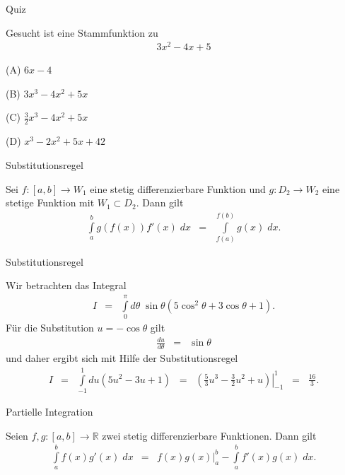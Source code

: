 \documentclass[german]{beamer}
\newcommand{\bq}{\begin{eqnarray*}}
\newcommand{\eq}{\end{eqnarray*}}
\begin{document}
\begin{frame}{Quiz}

Gesucht ist eine Stammfunktion zu
\bq
 3 x^2 - 4 x + 5
\eq
\begin{description}
\item{(A)} $6 x - 4$
\item{(B)} $3 x^3 - 4 x^2 + 5 x$
\item{(C)} $\frac{3}{2}x^3-4x^2 + 5 x$
\item{(D)} $x^3 -2 x^2 + 5 x + 42$
\end{description}

\end{frame}

\begin{frame}{Substitutionsregel}

\begin{theorem}
Sei $f : [a,b] \rightarrow W_1$ eine stetig differenzierbare Funktion und 
$g : D_2 \rightarrow W_2$ eine stetige Funktion mit $W_1 \subset D_2$.
Dann gilt
\bq
 \int\limits_a^b g\left( f(x) \right) f'(x) \; dx & = & 
 \int\limits_{f(a)}^{f(b)} g(x) \; dx.
\eq
\end{theorem}

\end{frame}

\begin{frame}{Substitutionsregel}

\begin{example}
Wir betrachten das Integral
\bq
 I & = &
 \int\limits_0^\pi d\theta \; \sin \theta \left( 5 \cos^2 \theta + 3 \cos \theta + 1 \right).
\eq
F\"ur die Substitution $u = - \cos \theta$ gilt
\bq
 \frac{du}{d\theta} & = & \sin \theta
\eq
und daher ergibt sich mit Hilfe der Substitutionsregel
\bq
 I & = &
 \int\limits_{-1}^1 du \left( 5 u^2 - 3 u + 1 \right)
 \;\; = \;\;
 \left. \left( \frac{5}{3} u^3 - \frac{3}{2} u^2 + u \right) \right|_{-1}^1
 \;\; = \;\;
 \frac{16}{3}. 
\eq
\end{example}

\end{frame}

\begin{frame}{Partielle Integration}

\begin{theorem}
Seien $f,g: [a,b] \rightarrow \mathbb R$ zwei stetig differenzierbare
Funktionen. Dann gilt
\bq
 \int\limits_a^b f(x) g'(x) \; dx
 & = & 
 \left. f(x) g(x) \right|_a^b - \int\limits_a^b f'(x) g(x) \; dx.
\eq
\end{theorem}

\end{frame}
\end{document}
